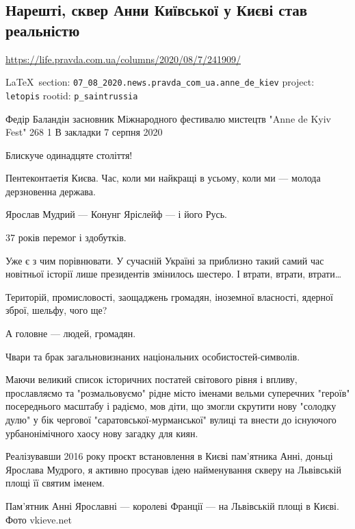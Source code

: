  
 
\subsection{Нарешті, сквер Анни Київської у Києві став реальністю}
\url{https://life.pravda.com.ua/columns/2020/08/7/241909/}
  
\vspace{0.5cm}
 {\ifDEBUG\small\LaTeX~section: \verb|07_08_2020.news.pravda_com_ua.anne_de_kiev| project: \verb|letopis| rootid: \verb|p_saintrussia| \fi}
\vspace{0.5cm}

Федір Баландін засновник Міжнародного фестивалю мистецтв "Anne de Kyiv Fest"
268 1 В закладки 7 серпня 2020

Блискуче одинадцяте століття!

Пентеконтаетія Києва. Час, коли ми найкращі в усьому, коли ми --- молода
дерзновенна держава.

Ярослав Мудрий --- Конунг Яріслейф --- і його Русь.

37 років перемог і здобутків.

Уже є з чим порівнювати. У сучасній Україні за приблизно такий самий час
новітньої історії лише президентів змінилось шестеро. І втрати, втрати, втрати…

Територій, промисловості, заощаджень громадян, іноземної власності, ядерної
зброї, шельфу, чого ще?

А головне --- людей, громадян.

Чвари та брак загальновизнаних національних особистостей-символів.

Маючи великий список історичних постатей світового рівня і впливу, прославляємо
та "розмальовуємо" рідне місто іменами вельми суперечних "героїв" посереднього
масштабу і радіємо, мов діти, що змогли скрутити нову "солодку дулю" у бік
чергової "саратовської-мурманської" вулиці та внести до існуючого
урбанонімічного хаосу нову загадку для киян.

Реалізувавши 2016 року проєкт встановлення в Києві пам’ятника Анні, доньці
Ярослава Мудрого, я активно просував ідею найменування скверу на Львівській
площі її святим іменем.

Пам'ятник Анні Ярославні --- королеві Франції --- на Львівській площі в Києві.  Фото
vkieve.net

